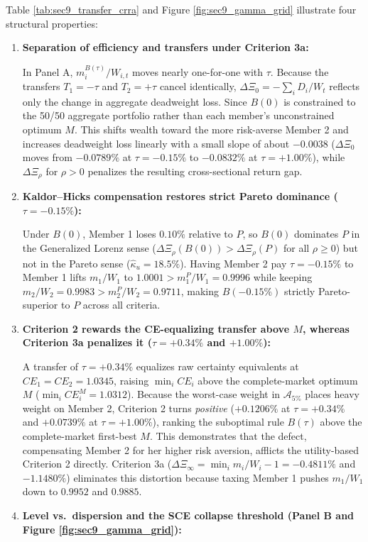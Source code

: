 \documentclass[11pt,a4paper]{article}
\theoremstyle{definition}
\theoremstyle{plain}
\theoremstyle{remark}
\newcommand{\1}{\mathbf{1}}
\begin{document}
Table \ref{tab:sec9_transfer_crra} and Figure \ref{fig:sec9_gamma_grid} illustrate four structural properties:
\begin{enumerate}
    \item \textbf{Separation of efficiency and transfers under Criterion 3a:} 
    
    In Panel A, $m_i^{B(\tau)}/W_{i,t}$ moves nearly one-for-one with $\tau$. Because the transfers $T_1 = -\tau$ and $T_2 = +\tau$ cancel identically, $\Delta \Xi_0 = -\sum_i D_i / W_t$ reflects only the change in aggregate deadweight loss. Since $B(0)$ is constrained to the 50/50 aggregate portfolio rather than each member's unconstrained optimum $M$. This shifts wealth toward the more risk-averse Member 2 and increases deadweight loss linearly with a small slope of about $-0.0038$ ($\Delta \Xi_0$ moves from $-0.0789\%$ at $\tau = -0.15\%$ to $-0.0832\%$ at $\tau = +1.00\%$), while $\Delta \Xi_\rho$ for $\rho > 0$ penalizes the resulting cross-sectional return gap.
    \item \textbf{Kaldor--Hicks compensation restores strict Pareto dominance ($\tau = -0.15\%$):} 
    
    Under $B(0)$, Member 1 loses $0.10\%$ relative to $P$, so $B(0)$ dominates $P$ in the Generalized Lorenz sense ($\Delta \Xi_\rho(B(0)) > \Delta \Xi_\rho(P)$ for all $\rho \ge 0$) but not in the Pareto sense ($\hat{\kappa}_u = 18.5\%$). Having Member 2 pay $\tau = -0.15\%$ to Member 1 lifts $m_1/W_1$ to $1.0001 > m_1^P/W_1 = 0.9996$ while keeping $m_2/W_2 = 0.9983 > m_2^P/W_2 = 0.9711$, making $B(-0.15\%)$ strictly Pareto-superior to $P$ across all criteria.
    \item \textbf{Criterion 2 rewards the CE-equalizing transfer above $M$, whereas Criterion 3a penalizes it ($\tau = +0.34\%$ and $+1.00\%$):} 
    
    A transfer of $\tau = +0.34\%$ equalizes raw certainty equivalents at $CE_1 = CE_2 = 1.0345$, raising $\min_i CE_i$ above the complete-market optimum $M$ ($\min_i CE_i^M = 1.0312$). Because the worst-case weight in $\mathcal{A}_{5\%}$ places heavy weight on Member 2, Criterion 2 turns \emph{positive} ($+0.1206\%$ at $\tau = +0.34\%$ and $+0.0739\%$ at $\tau = +1.00\%$), ranking the suboptimal rule $B(\tau)$ above the complete-market first-best $M$. This demonstrates that the \citet{FleurbaeyManiquet2011} defect, compensating Member 2 for her higher risk aversion, afflicts the utility-based Criterion 2 directly. Criterion 3a ($\Delta \Xi_\infty = \min_i m_i/W_i - 1 = -0.4811\%$ and $-1.1480\%$) eliminates this distortion because taxing Member 1 pushes $m_1/W_1$ down to $0.9952$ and $0.9885$.
    \item \textbf{Level vs.\ dispersion and the SCE collapse threshold (Panel B and Figure \ref{fig:sec9_gamma_grid}):} 
    

\end{enumerate}
\end{document}

